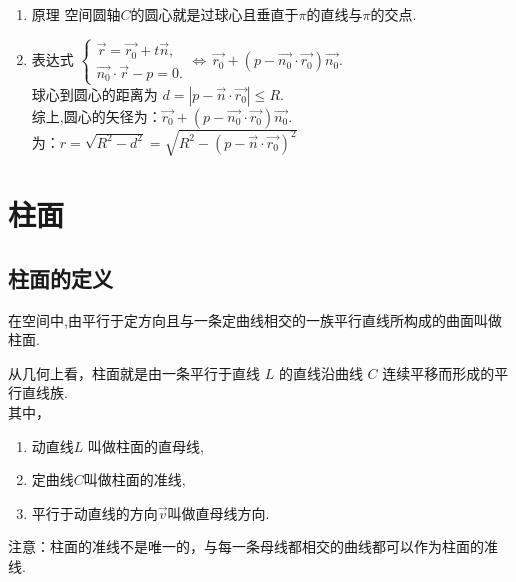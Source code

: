 \begin{enumerate}[]
	\setlength{\itemindent}{2em}
	\setlength{\topsep}{0.01em}
	\setlength{\itemsep}{0.01em}
	\item {\color{dy}原理} \quad 空间圆轴$C$的圆心就是过球心且垂直于$\pi$的直线与$\pi $的交点.
	\item {\color{dy}表达式} \jg \quad
	$
	\begin{cases}
	\overrightarrow{r}=\overrightarrow{r_0}+t\overrightarrow{n},\\
	\overrightarrow{n_0} \cdot \overrightarrow{r}-p=0.
	\end{cases}
	\Longleftrightarrow \, \overrightarrow{r_0}+(p-\overrightarrow{n_0}\cdot \overrightarrow{r_0})\overrightarrow{n_0}.
	$\\
	\jg \hspace*{6em}球心到圆心的距离为
	$
	d=|p-\overrightarrow{n} \cdot \overrightarrow{r_0}| \le R.
	$\\
	\jg 综上,{\color{dy}圆心的矢径}为：$\overrightarrow{r_0}+(p-\overrightarrow{n_0}\cdot \overrightarrow{r_0})\overrightarrow{n_0}$.\\
	为：$r=\sqrt{R^2-d^2}=\sqrt{R^2-(p-\overrightarrow{n} \cdot \overrightarrow{r_0})^2}$
\end{enumerate}

\section{柱面}
\subsection{柱面的定义}
\tdefination[柱面]
在空间中,由平行于定方向且与一条定曲线相交的一族平行直线所构成的曲面叫做{\color{dy}柱面}.
\par 从几何上看，柱面就是由一条平行于直线 $L$ 的直线沿曲线 $C$ 连续平移而形成的{\color{dy}平行直线族}.\\
其中，
\sj
\begin{enumerate}[]
	\setlength{\itemindent}{2em}
	\setlength{\topsep}{0.01em}
	\setlength{\itemsep}{0.01em}
	\item 动直线$L$ 叫做柱面的{\color{dy}直母线},
	\item 定曲线$C$叫做柱面的{\color{dy}准线},
	\item 平行于动直线的方向$\overrightarrow{v}$叫做{\color{dy}直母线方向}.
\end{enumerate}
注意：柱面的准线不是唯一的，与每一条母线都相交的曲线都可以作为柱面的准线.

